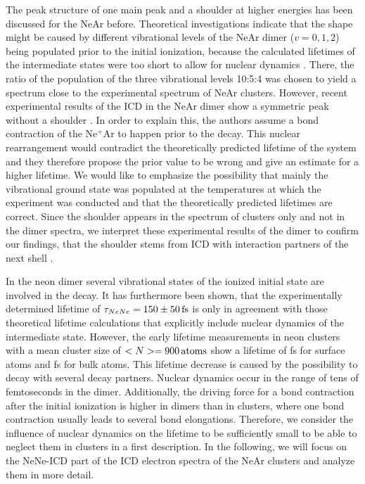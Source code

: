 The peak structure of one main peak and a shoulder at higher energies has been
discussed for the NeAr before. Theoretical investigations indicate that the
shape might be caused by different vibrational levels of the NeAr dimer
($v=0,1,2$) being populated prior to the initial ionization, because
the calculated lifetimes of the intermediate states were too short to allow
for nuclear dynamics \cite{Scheit06}.
There, the ratio of the population of the three vibrational levels 10:5:4
was chosen to yield a spectrum close to the experimental spectrum of NeAr
clusters.
However,
recent experimental results of the ICD in the NeAr dimer show a symmetric peak
without a shoulder \cite{OKeeffe14}. In order to explain this, the authors assume
a bond contraction of the Ne$^+$Ar to happen prior to the decay.
This nuclear rearrangement would contradict the
theoretically predicted lifetime of the system and they therefore propose
the prior value to be wrong and give an estimate for a higher lifetime.
We would like to emphasize the possibility that mainly the vibrational
ground state was populated at the temperatures at which the
experiment was conducted and that the theoretically predicted lifetimes are
correct.
Since the shoulder appears in the spectrum of clusters only and not in the
dimer spectra, we interpret these experimental results of the dimer to confirm our
findings, that the shoulder stems from ICD with interaction partners of the
next shell \cite{Fasshauer14_1}.

In the neon dimer several vibrational states of the ionized initial state are
involved in the decay. \cite{Santra00_1} It has furthermore been shown, that
the experimentally determined lifetime of $\tau_{NeNe}=\unit[150\pm 50]{fs}$
\cite{Schnorr13} is only in agreement with those theoretical lifetime
calculations that explicitly include nuclear dynamics of the intermediate state.
\cite{Schnorr15} However, the early lifetime measurements in neon clusters with
a mean cluster size of $<N>=\unit[900]{atoms}$ show a lifetime of
\unit[30]{fs} for surface atoms and \unit[6]{fs} for bulk atoms. This lifetime
decrease is caused by the possibility to decay with several decay partners.
Nuclear dynamics occur in the range of tens of femtoseconds in the dimer.
Additionally, the driving force for a bond contraction after the initial
ionization is higher in dimers than in clusters, where one bond contraction
usually leads to several bond elongations. Therefore, we consider the influence
of nuclear dynamics on the lifetime to be sufficiently small to be able to
neglect them in clusters in a first description.
\cite{Santra01_3,Ohrwall04}
In the following, we will focus on the NeNe-ICD part of the
ICD electron spectra of the NeAr clusters and analyze them in more detail.

